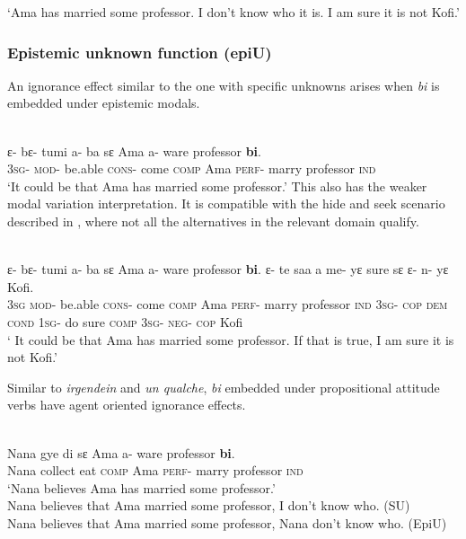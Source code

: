 \documentclass[output=paper,modfonts,nonflat,draftmode]{langsci/langscibook}
\begin{document}
\glt `Ama has married some professor. I don't know who it is. I am sure it is not Kofi.' 
\z 

\subsubsection{Epistemic unknown function (epiU)}
An ignorance effect similar to the one with specific unknowns arises when \emph{bi} is embedded under epistemic modals.

\ea\label{owusu:ex42a}\\
 \gll  ε- bε- tumi a- ba sε Ama a- ware professor \textbf{bi}. 
\\
\textsc{3sg}- \textsc{mod}- be.able \textsc{cons}- come \textsc{comp} Ama \textsc{perf}- marry professor \textsc{ind} \\
    
\glt `It could be that Ama has married some professor.' 
\z 
This also has the weaker modal variation interpretation. It is compatible with the hide and seek scenario described in \citet{AloniPort2015}, where not all the alternatives in the relevant domain qualify.

\ea\label{owusu:ex42b}\\
 \gll  ε- bε- tumi a- ba sε Ama a- ware professor \textbf{bi}. ε- te saa a  me- yε sure sε ε- n- yε Kofi. \\
\textsc{3sg} 
 \textsc{mod}- be.able \textsc{cons}- come \textsc{comp} Ama \textsc{perf}- marry professor \textsc{ind} \textsc{3sg}- \textsc{cop} \textsc{dem} \textsc{cond} \textsc{1sg}- do sure \textsc{comp}  \textsc{3sg}- \textsc{neg}- \textsc{cop} Kofi\\
\glt ` It could be that Ama has married some professor. If that is true, I am sure it is not Kofi.' 
\z 

Similar to \emph{irgendein} and \emph{un qualche}, \emph{bi} embedded under propositional attitude verbs have agent oriented ignorance effects.  

 \ea\label{owusu:ex42c}\\
 \gll  Nana gye di sε Ama a- ware professor \textbf{bi}. \\
Nana collect eat \textsc{comp} Ama \textsc{perf}- marry professor \textsc{ind}\\
\glt `Nana believes Ama has married some professor.' \\
Nana believes that Ama married some professor, I don't know who. (SU)\\
Nana believes that Ama married some professor, Nana don't know who. (EpiU)
\z 
\end{document}
